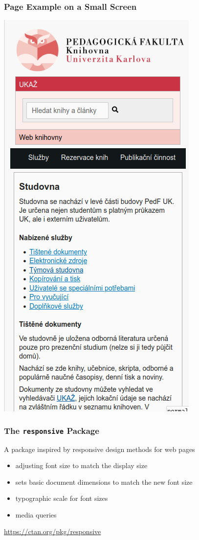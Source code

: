 \begin{frame}
  \frametitle{Page Example on a Small Screen}
  \begin{center}
    \includegraphics[height=.8\textheight]{img/pedf-web-small.png}
  \end{center}
\end{frame}

\begin{frame}
  \frametitle{The \texttt{responsive} Package}

  A package inspired by responsive design methods for web pages
  \begin{itemize}
  \item adjusting font size to match the display size
  \item sets basic document dimensions to match the new font size
  \item typographic scale for font sizes
  \item media queries
  \end{itemize}

  \bigskip

  \url{https://ctan.org/pkg/responsive}
\end{frame}

